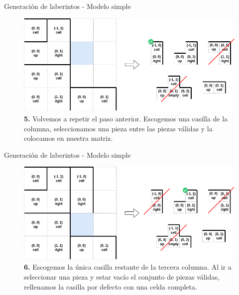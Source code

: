 \documentclass{beamer}
\begin{document}
    \begin{frame}{Generación de laberintos - Modelo simple \scriptsize{\hfill \secname}}
        \begin{figure}[H]
        \centering
            \includegraphics[scale=0.375]{img/paso5.png}
            \caption{\textbf{5.} Volvemos a repetir el paso anterior. Escogemos una casilla de la columna, seleccionamos una pieza entre las piezas válidas y la colocamos en nuestra matriz.}
        \end{figure}
    \end{frame}
    
    \begin{frame}{Generación de laberintos - Modelo simple \scriptsize{\hfill \secname}}
        \begin{figure}[H]
        \centering
            \includegraphics[scale=0.375]{img/paso6.png}
            \caption{\textbf{6.} Escogemos la única casilla restante de la tercera columna. Al ir a seleccionar una pieza y estar vacío el conjunto de piezas válidas, rellenamos la casilla por defecto con una celda completa.}
        \end{figure}
    \end{frame}
    
\end{document}
